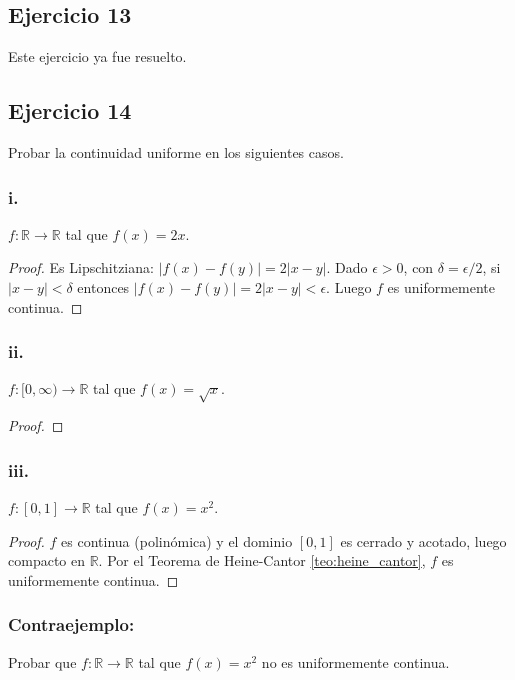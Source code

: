 \documentclass[11pt, a4paper]{article}
\begin{document}
\subsection*{Ejercicio 13}

Este ejercicio ya fue resuelto.

\subsection*{Ejercicio 14}

Probar la continuidad uniforme en los siguientes casos.

\subsubsection*{i.}
$f: \mathbb{R} \to \mathbb{R}$ tal que $f(x) = 2x$.

\begin{proof}
Es Lipschitziana: $|f(x) - f(y)| = 2|x - y|$. Dado $\epsilon > 0$, con $\delta = \epsilon/2$, si
$|x - y| < \delta$ entonces $|f(x) - f(y)| = 2|x - y| < \epsilon$. Luego $f$ es uniformemente
continua.
\end{proof}

\subsubsection*{ii.}
$f: [0, \infty) \to \mathbb{R}$ tal que $f(x) = \sqrt{x}$.

\begin{proof}
\end{proof}

\subsubsection*{iii.}
$f: [0, 1] \to \mathbb{R}$ tal que $f(x) = x^2$.

\begin{proof}
$f$ es continua (polinómica) y el dominio $[0, 1]$ es cerrado y acotado, luego compacto en
$\mathbb{R}$. Por el Teorema de Heine-Cantor \ref{teo:heine_cantor}, $f$ es uniformemente continua.
\end{proof}

\subsubsection*{Contraejemplo:}
Probar que $f: \mathbb{R} \to \mathbb{R}$ tal que $f(x) = x^2$ no es uniformemente continua.
\end{document}

